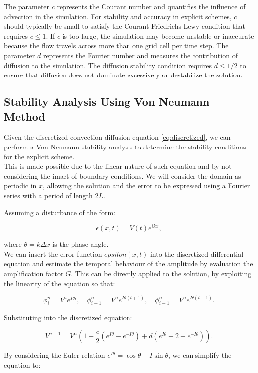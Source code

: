 \documentclass{article}
\begin{document}
The parameter $c$ represents the Courant number and quantifies the influence of advection in the simulation. 
For stability and accuracy in explicit schemes, $c$ should typically be small to satisfy the Courant-Friedrichs-Lewy condition that requires $c \leq 1$. 
If $c$ is too large, the simulation may become unstable or inaccurate because the flow travels across more than one grid cell per time step.
The parameter $d$ represents the Fourier number and measures the contribution of diffusion to the simulation.
The diffusion stability condition requires $d \leq 1/2$ to ensure that diffusion does not dominate excessively or destabilize the solution.


\subsection{Stability Analysis Using Von Neumann Method}
Given the discretized convection-diffusion equation \eqref{eq:discretized}, we can perform a Von Neumann stability analysis to determine the stability conditions for the explicit scheme. 
\\This is made possible due to the linear nature of such equation and by not considering the imact of boundary conditions. 
We will consider the domain as periodic in \(x\), allowing the solution and the error to be expressed using a Fourier series with a period of length \(2L\).

Assuming a disturbance of the form:

\[
\epsilon(x, t) = V(t) e^{ikx},
\]

where $\theta = k \Delta x$ is the phase angle.
\\We can insert the error function \(epsilon(x, t)\) into the discretized differential equation and estimate the temporal behaviour of the amplitude by evaluation the amplification factor \(G\). This can be directly applied to the solution, by exploiting the linearity of the equation so that:

\[
\phi_i^n = V^n e^{I \theta i}, \quad \phi_{i+1}^n = V^n e^{I \theta (i+1)}, \quad \phi_{i-1}^n = V^n e^{I \theta (i-1)}.
\]

Substituting into the discretized equation:

\[
V^{n+1} = V^n \left(1 - \frac{c}{2} (e^{I \theta} - e^{-I \theta}) + d (e^{I \theta} - 2 + e^{-I \theta})\right).
\]

By considering the Euler relation \(e^{I \theta} = \cos \theta + I \sin \theta\), we can simplify the equation to:
\end{document}
